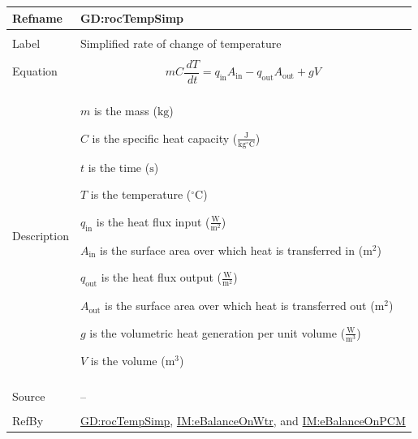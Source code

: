 \documentclass[12pt]{article}
\begin{document}
\vspace{\baselineskip}
\noindent
\begin{minipage}{\textwidth}
\begin{tabular}{>{\raggedright}p{}>{\raggedright\arraybackslash}p{}}
\toprule \textbf{Refname} & \textbf{GD:rocTempSimp}
\label{GD:rocTempSimp}
\\ \midrule \\
Label & Simplified rate of change of temperature
        
\\ \midrule \\
Equation & \begin{displaymath}
           m C \frac{\,dT}{\,dt}={q_{\text{in}}} {A_{\text{in}}}-{q_{\text{out}}} {A_{\text{out}}}+g V
           \end{displaymath}
\\ \midrule \\
Description & \begin{symbDescription}
              \item{$m$ is the mass (${\text{kg}}$)}
              \item{$C$ is the specific heat capacity ($\frac{\text{J}}{\text{kg}{}^{\circ}\text{C}}$)}
              \item{$t$ is the time (${\text{s}}$)}
              \item{$T$ is the temperature (${{}^{\circ}\text{C}}$)}
              \item{${q_{\text{in}}}$ is the heat flux input ($\frac{\text{W}}{\text{m}^{2}}$)}
              \item{${A_{\text{in}}}$ is the surface area over which heat is transferred in (${\text{m}^{2}}$)}
              \item{${q_{\text{out}}}$ is the heat flux output ($\frac{\text{W}}{\text{m}^{2}}$)}
              \item{${A_{\text{out}}}$ is the surface area over which heat is transferred out (${\text{m}^{2}}$)}
              \item{$g$ is the volumetric heat generation per unit volume ($\frac{\text{W}}{\text{m}^{3}}$)}
              \item{$V$ is the volume (${\text{m}^{3}}$)}
              \end{symbDescription}
\\ \midrule \\
Source & --
         
\\ \midrule \\
RefBy & \hyperref[GD:rocTempSimp]{GD:rocTempSimp}, \hyperref[IM:eBalanceOnWtr]{IM:eBalanceOnWtr}, and \hyperref[IM:eBalanceOnPCM]{IM:eBalanceOnPCM}
        
\\ \bottomrule
\end{tabular}
\end{minipage}
\end{document}
